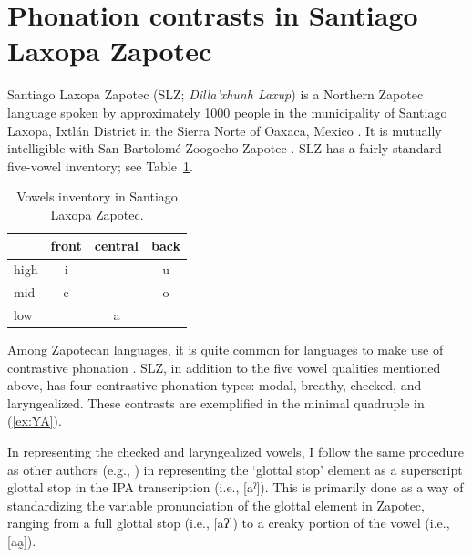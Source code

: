 \documentclass[12pt, letterpaper]{article}
\providecommand{\lsptoprule}{\midrule\toprule}
\providecommand{\lspbottomrule}{\bottomrule\midrule}
\begin{document}
\section{Phonation contrasts in Santiago Laxopa Zapotec} \label{sec:SLZ}

Santiago Laxopa Zapotec (SLZ; \textit{Dilla'xhunh Laxup}) is a Northern Zapotec language spoken by approximately 1000 people in the municipality of Santiago Laxopa, Ixtlán District in the Sierra Norte of Oaxaca, Mexico \citep{adlerAcousticsPhonationTypes2016,adlerDerivationVerbInitiality2018,foleyForbiddenCliticClusters2018,foleyExtendingPersonCaseConstraint2020}. It is mutually intelligible with San Bartolomé Zoogocho Zapotec \citep{longDiccionarioZapotecoSan2005,sonnenscheinDescriptiveGrammarSan2005}. SLZ has a fairly standard five-vowel inventory; see Table~\ref{tab:SLZvowels}.

\begin{table}[!h]
\centering
\caption{Vowels inventory in Santiago Laxopa Zapotec.}
\label{tab:SLZvowels}
    \begin{tabular}{lccc}
    \lsptoprule
	&  front& central  & back \\
    \midrule
    high   	&  i  &     &   u \\
    mid    	&  e  &   	& 	o \\
    low   	&     &  a 	&	  \\
    \lspbottomrule
    \end{tabular}
\end{table}
		
Among Zapotecan languages, it is quite common for languages to make use of contrastive phonation \citep[e.g.,][]{avelinobecerraTopicsYalalagZapotec2004,longDiccionarioZapotecoSan2005,avelinoAcousticElectroglottographicAnalyses2010,lopeznicolasEstudiosFonologiaGramatica2016,chavez-peonInteractionMetricalStructure2010}. 
SLZ, in addition to the five vowel qualities mentioned above, has four contrastive phonation types: modal, breathy, checked, and laryngealized. These contrasts are exemplified in the minimal quadruple in (\ref{ex:YA}).

In representing the checked and laryngealized vowels, I follow the same procedure as other authors (e.g., \citet{avelinoAcousticElectroglottographicAnalyses2010, uchiharaToneRegistrogenesisQuiavini2016}) in representing the `glottal stop' element as a superscript glottal stop in the IPA transcription (i.e., [aˀ]). This is primarily done as a way of standardizing the variable pronunciation of the glottal element in Zapotec, ranging from a full glottal stop (i.e., [aʔ]) to a creaky portion of the vowel (i.e., [aa̰]).  
\end{document}
